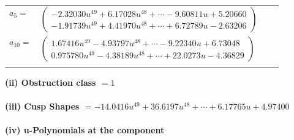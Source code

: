\documentclass[1p]{elsarticle_modified}
\theoremstyle{definition}
\begin{document}
\begin{tabular}{m{7pt} m{180pt} m{7pt} m{180pt} }
\flushright $a_{5}=$&$\begin{pmatrix}-2.32030 u^{49}+6.17028 u^{48}+\cdots-9.60811 u+5.20660\\-1.91739 u^{49}+4.41970 u^{48}+\cdots+6.72789 u-2.63206\end{pmatrix}$ \\
\flushright $a_{10}=$&$\begin{pmatrix}1.67416 u^{49}-4.93797 u^{48}+\cdots-9.22340 u+6.73048\\0.975780 u^{49}-4.38189 u^{48}+\cdots+22.0273 u-4.36829\end{pmatrix}$\\&\end{tabular}
\flushleft \textbf{(ii) Obstruction class $= 1$}\\~\\
\flushleft \textbf{(iii) Cusp Shapes $= -14.0416 u^{49}+36.6197 u^{48}+\cdots+6.17765 u+4.97400$}\\~\\
\newpage\renewcommand{\arraystretch}{1}
\flushleft \textbf{(iv) u-Polynomials at the component}\newline \\
\end{document}
